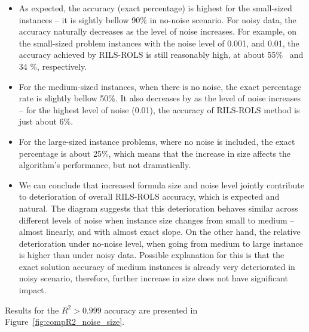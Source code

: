 \documentclass{bmcart}
\begin{document}
\begin{itemize}
	\item   As expected, the accuracy (exact percentage) is highest for the small-sized instances -- it is sightly bellow 90\% in no-noise scenario. For noisy data, the accuracy naturally decreases as the level of noise increases. For example, on the small-sized problem instances with the noise level of 0.001, and 0.01, the accuracy achieved by \textsc{RILS}-\textsc{ROLS} is still reasonably high, at about 55\%~ and 34 \%, respectively. 
	\item For the medium-sized instances, when there is no noise, the exact percentage rate is slightly bellow 50\%. It also decreases by as the level of noise increases -- for the highest level of noise (0.01), the accuracy of \textsc{RILS}-\textsc{ROLS} method is just about 6\%. 
	\item For the large-sized instance problems, where no noise is included, the exact percentage is about 25\%, which means that the increase in size affects the algorithm's performance, but not dramatically.  
	
	\item We can conclude that increased formula size and noise level jointly contribute to deterioration of overall \textsc{RILS-ROLS} accuracy, which is expected and natural. The diagram suggests that this deterioration behaves similar across different levels of noise when instance size changes from small to medium -- almost linearly, and with almost exact slope. On the other hand, the relative deterioration under no-noise level, when going from medium to large instance is higher than under noisy data. Possible explanation for this is that the exact solution accuracy of medium instances is already very deteriorated in noisy scenario, therefore, further increase in size does not have significant impact. 
\end{itemize}
	
Results for the $R^2 > 0.999$ accuracy are presented in Figure~\ref{fig:compR2_noise_size}. 

\begin{center}
	\label{fig:compR2_noise_size}
\end{center}
\end{document}
